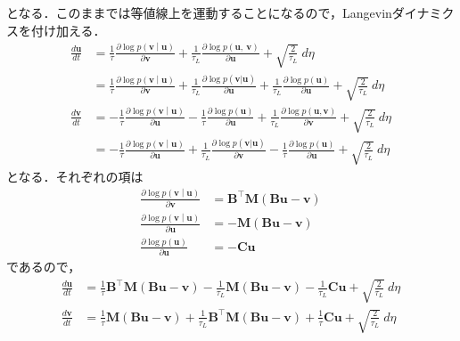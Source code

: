 となる．このままでは等値線上を運動することになるので，Langevinダイナミクスを付け加える．
\begin{align}
\frac{d\mathbf{u}}{dt} &= \frac{1}{\tau}\frac{\partial\log{p\left( \mathbf{v} \middle| \mathbf{u} \right)}}{\partial\mathbf{v}} + \frac{1}{\tau_{L}}\frac{\partial\log{p\left( \mathbf{u},\ \mathbf{v} \right)}}{\partial\mathbf{u}} + \sqrt{\frac{2}{\tau_{L}}}\ d\eta\\
&= \frac{1}{\tau}\frac{\partial\log{p\left( \mathbf{v} \middle| \mathbf{u} \right)}}{\partial\mathbf{v}} + \frac{1}{\tau_{L}}\frac{\partial\log{p\left( \mathbf{v|u} \right)}}{\partial\mathbf{u}} + \frac{1}{\tau_{L}}\frac{\partial\log{p\left( \mathbf{u} \right)}}{\partial\mathbf{u}} + \sqrt{\frac{2}{\tau_{L}}}\ d\eta\\
\frac{d\mathbf{v}}{dt} &= - \frac{1}{\tau}\frac{\partial\log{p\left( \mathbf{v} \middle| \mathbf{u} \right)}}{\partial\mathbf{u}} - \frac{1}{\tau}\frac{\partial\log{p\left( \mathbf{u} \right)}}{\partial\mathbf{u}} + \frac{1}{\tau_{L}}\frac{\partial\log{p\left( \mathbf{u},\mathbf{v} \right)}}{\partial\mathbf{v}} + \sqrt{\frac{2}{\tau_{L}}}\ d\eta\\
&= - \frac{1}{\tau}\frac{\partial\log{p\left( \mathbf{v} \middle| \mathbf{u} \right)}}{\partial\mathbf{u}} + \frac{1}{\tau_{L}}\frac{\partial\log{p\left( \mathbf{v|u} \right)}}{\partial\mathbf{v}} - \frac{1}{\tau}\frac{\partial\log{p\left( \mathbf{u} \right)}}{\partial\mathbf{u}} + \sqrt{\frac{2}{\tau_{L}}}\ d\eta
\end{align}
となる．それぞれの項は
\begin{align}
\frac{\partial\log{p\left( \mathbf{v} \middle| \mathbf{u} \right)}}{\partial\mathbf{v}} &= \mathbf{B}^{\top}\mathbf{M}\left( \mathbf{Bu} - \mathbf{v} \right)\\
\frac{\partial\log{p\left( \mathbf{v} \middle| \mathbf{u} \right)}}{\partial\mathbf{u}} &= - \mathbf{M}\left( \mathbf{Bu} - \mathbf{v} \right)\\
\frac{\partial\log{p\left( \mathbf{u} \right)}}{\partial\mathbf{u}} &= - \mathbf{Cu}
\end{align}
であるので，
\begin{align}
\frac{d\mathbf{u}}{dt} &= \frac{1}{\tau}\mathbf{B}^{\top}\mathbf{M}\left( \mathbf{Bu} - \mathbf{v} \right) - \frac{1}{\tau_{L}}\mathbf{M}\left( \mathbf{Bu} - \mathbf{v} \right) - \frac{1}{\tau_{L}}\mathbf{Cu} + \sqrt{\frac{2}{\tau_{L}}}\ d\eta\\
\frac{d\mathbf{v}}{dt} &= \frac{1}{\tau}\mathbf{M}\left( \mathbf{Bu} - \mathbf{v} \right) + \frac{1}{\tau_{L}}\mathbf{B}^{\top}\mathbf{M}\left( \mathbf{Bu} - \mathbf{v} \right) + \frac{1}{\tau}\mathbf{Cu} + \sqrt{\frac{2}{\tau_{L}}}\ d\eta
\end{align}
